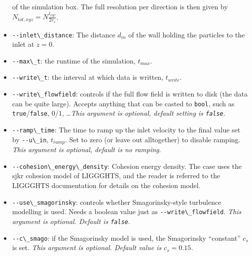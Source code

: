 \documentclass[12pt]{article}
\newcommand{\cloption}[1]{\lstinline{#1}}
\begin{document}
\begin{itemize}
    of the simulation box. The full resolution per direction is then
    given by $N_{tot,xyz} = N \frac{l_{xyz}}{2r_s}$.
  \item \cloption{--inlet\_distance}: The distance $d_{in}$ of the
    wall holding the particles to the inlet at $z=0$.
  \item \cloption{--max\_t}: the runtime of the simulation, $t_{max}$.
  \item \cloption{--write\_t}: the interval at which data is written, $t_{write}$.
  \item \cloption{--write\_flowfield}: controls if the full flow
    field is written to disk (the data can be quite large). Accepts
    anything that can be casted to \lstinline{bool}, such as
    \lstinline{true}/\lstinline{false}, $0$/$1$, \ldots \emph{This
      argument is optional, default setting is \lstinline{false}}.
  \item \cloption{--ramp\_time}: The time to ramp up the inlet
    velocity to the final value set by \cloption{--u\_in},
    $t_{ramp}$. Set to zero (or leave out alltogether) to disable
    ramping. \emph{This argument is optional, default is no ramping}.
  \item \cloption{--cohesion\_energy\_density}: Cohesion energy
    density. The case uses the sjkr cohesion model of LIGGGHTS, and
    the reader is referred to the LIGGGHTS documentation for details
    on the cohesion model.
  \item \cloption{--use\_smagorinsky}: controls whether
    Smagorinsky-style turbulence modelling is used. Needs a boolean
    value just as \cloption{--write\_flowfield}. \emph{This argument
      is optional. Default is \lstinline{false}}.
  \item \cloption{--c\_smago}: if the Smagorinsky model is used, the
    Smagorinsky ``constant'' $c_s$ is set. \emph{This argument is
      optional. Default value is $c_s = 0.15$.}
\end{itemize}
\end{document}
